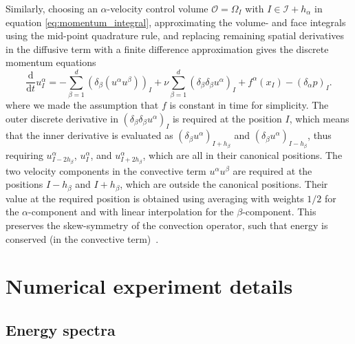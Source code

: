 \documentclass[preprint]{elsarticle}
\begin{document}
Similarly, choosing an $\alpha$-velocity control volume $\mathcal{O} =
\Omega_{I}$ with $I \in \mathcal{I} + h_\alpha$ in equation
\eqref{eq:momentum_integral}, approximating the volume- and face integrals using
the mid-point quadrature rule, and replacing remaining spatial derivatives in
the diffusive term with a finite difference approximation gives the discrete
momentum equations
\begin{equation} \label{eq:momentum_discrete}
        \frac{\mathrm{d}}{\mathrm{d} t} u^\alpha_{I} =
        - \sum_{\beta = 1}^d
        (\delta_\beta (u^\alpha u^\beta))_{I}
        + \nu \sum_{\beta = 1}^d
        (\delta_\beta \delta_\beta u^\alpha)_{I}
        + f^\alpha(x_{I})
        - (\delta_\alpha p)_{I}.
\end{equation}
where we made the assumption that $f$ is constant in time for simplicity.
The outer discrete derivative in $(\delta_\beta \delta_\beta u^\alpha)_{I}$ is
required at the position $I$, which means that the inner derivative is evaluated
as $(\delta_\beta u^\alpha)_{I + h_\beta}$ and $(\delta_\beta u^\alpha)_{I -
h_\beta}$, thus requiring $u^\alpha_{I - 2 h_\beta}$, $u^\alpha_{I}$, and
$u^\alpha_{I + 2 h_\beta}$, which are all in their canonical positions. The two
velocity components in the convective term $u^\alpha u^\beta$ are required at
the positions $I - h_\beta$ and $I + h_\beta$, which are outside the canonical
positions. Their value at the required position is obtained using averaging with
weights $1 / 2$ for the $\alpha$-component and with linear interpolation for the
$\beta$-component. This preserves the skew-symmetry of the convection operator,
such that energy is conserved (in the convective term)~\cite{Verstappen2003}.

\section{Numerical experiment details} \label{sec:experiments}

\subsection{Energy spectra} \label{sec:energy}
\end{document}
